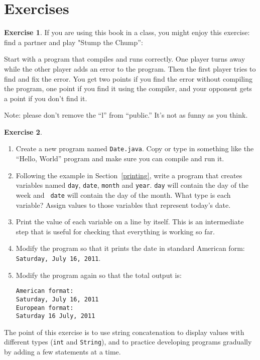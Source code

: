\documentclass[12pt]{book}
\theoremstyle{definition}
\newtheorem{excz}{Exercise}[chapter]
\newenvironment{exercise}{\bigskip\begin{excz}\mbox{}}{\end{excz}}
\begin{document}
\section{Exercises}

\begin{exercise}

If you are using this book in a class, you might enjoy this exercise:
find a partner and play "Stump the Chump'':  

Start with a program that compiles and runs correctly.  One player
turns away while the other player adds an error to the program.  Then
the first player tries to find and fix the error.  You get two points
if you find the error without compiling the program, one point if you
find it using the compiler, and your opponent gets a point if you
don't find it.

Note: please don't remove the ``l'' from ``public.''  It's not as
funny as you think.
\end{exercise}


\begin{exercise}
\label{ex.date}

\begin{enumerate}

\item Create a new program named {\tt Date.java}.  Copy or
type in something like the ``Hello, World'' program and make
sure you can compile and run it.

\item Following the example in Section~\ref{printing}, write a program
that creates variables named {\tt day}, {\tt date}, {\tt month}
and {\tt year}.  {\tt day} will contain the day of the week and {\tt
date} will contain the day of the month.  What type is each variable?
Assign values to those variables that represent today's date.

\item Print the value of each variable on a line by itself.  This is
an intermediate step that is useful for checking that everything is
working so far.

\item Modify the program so that it prints the date in standard
American form: {\tt Saturday, July 16, 2011}.

\item Modify the program again so that the total output is:

\begin{lstlisting}
American format:
Saturday, July 16, 2011
European format:
Saturday 16 July, 2011
\end{lstlisting}

\end{enumerate}

The point of this exercise is to use string concatenation to display
values with different types ({\tt int} and {\tt String}), and to
practice developing programs gradually by adding a few statements
at a time.

\end{exercise}
\end{document}
